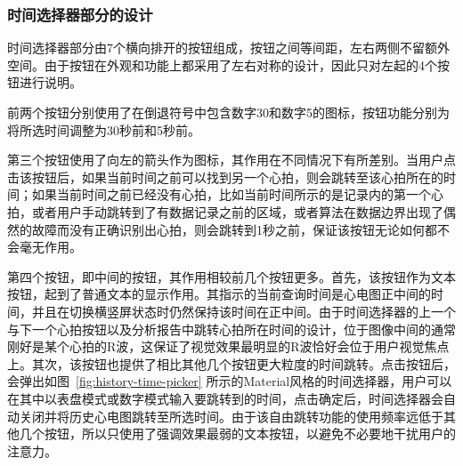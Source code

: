 \subsubsection{时间选择器部分的设计}\label{subsubsec:history-time-picker-design}

时间选择器部分由7个横向排开的按钮组成，按钮之间等间距，左右两侧不留额外空间。由于按钮在外观和功能上都采用了左右对称的设计，因此只对左起的4个按钮进行说明。

前两个按钮分别使用了在倒退符号中包含数字30和数字5的图标，按钮功能分别为将所选时间调整为30秒前和5秒前。

第三个按钮使用了向左的箭头作为图标，其作用在不同情况下有所差别。当用户点击该按钮后，如果当前时间之前可以找到另一个心拍，则会跳转至该心拍所在的时间；如果当前时间之前已经没有心拍，比如当前时间所示的是记录内的第一个心拍，或者用户手动跳转到了有数据记录之前的区域，或者算法在数据边界出现了偶然的故障而没有正确识别出心拍，则会跳转到1秒之前，保证该按钮无论如何都不会毫无作用。

第四个按钮，即中间的按钮，其作用相较前几个按钮更多。首先，该按钮作为文本按钮，起到了普通文本的显示作用。其指示的当前查询时间是心电图正中间的时间，并且在切换横竖屏状态时仍然保持该时间在正中间。由于时间选择器的上一个与下一个心拍按钮以及分析报告中跳转心拍所在时间的设计，位于图像中间的通常刚好是某个心拍的R波，这保证了视觉效果最明显的R波恰好会位于用户视觉焦点上。其次，该按钮也提供了相比其他几个按钮更大粒度的时间跳转。点击按钮后，会弹出如图~\ref{fig:history-time-picker} 所示的Material风格的时间选择器，用户可以在其中以表盘模式或数字模式输入要跳转到的时间，点击确定后，时间选择器会自动关闭并将历史心电图跳转至所选时间。由于该自由跳转功能的使用频率远低于其他几个按钮，所以只使用了强调效果最弱的文本按钮，以避免不必要地干扰用户的注意力。

